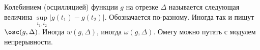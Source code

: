 
 	Колебинием (осцилляцией) функции $g$ на отрезке $\Delta$ называется следующая величина $\sup\limits_{t_1,t_2}\big|g(t_1)-g(t_2)\big|$.
 	Обозначается по-разному. Иногда так и пишут $\osc(g,\Delta)$. Иногда $w(g,\Delta)$, иногда $\omega(g,\Delta)$. Омегу можно путать с модулем непрерывности.
 